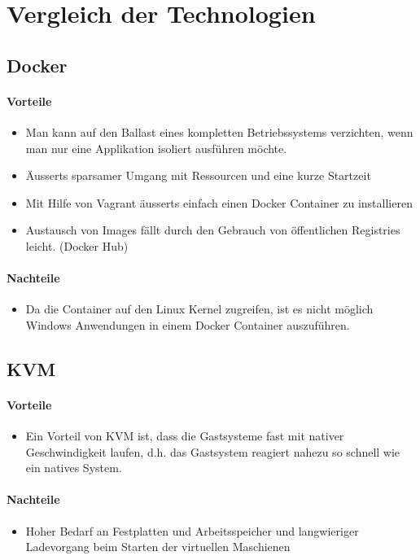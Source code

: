 \section{Vergleich der Technologien}
\subsection{Docker}
\paragraph{Vorteile}
\begin{itemize}
	\item Man kann auf den Ballast eines kompletten Betriebssystems verzichten, wenn man nur eine Applikation isoliert ausführen möchte.
	\item Äusserts sparsamer Umgang mit Ressourcen und eine kurze Startzeit	
	\item Mit Hilfe von Vagrant äusserts einfach einen Docker Container zu installieren
	\item Austausch von Images fällt durch den Gebrauch von öffentlichen Registries leicht. (Docker Hub)
\end{itemize}
\paragraph{Nachteile}
\begin{itemize}
	\item Da die Container auf den Linux Kernel zugreifen, ist es nicht möglich Windows Anwendungen in einem Docker Container auszuführen.
\end{itemize}


\subsection{KVM} %
\paragraph{Vorteile}
\begin{itemize}
	\item Ein Vorteil von KVM ist, dass die Gastsysteme fast mit nativer Geschwindigkeit laufen, d.h. das Gastsystem reagiert nahezu so schnell wie ein natives System. 
\end{itemize}
\paragraph{Nachteile}
\begin{itemize}
	\item Hoher Bedarf an Festplatten und Arbeitsspeicher und langwieriger Ladevorgang beim Starten der virtuellen Maschienen
\end{itemize}


